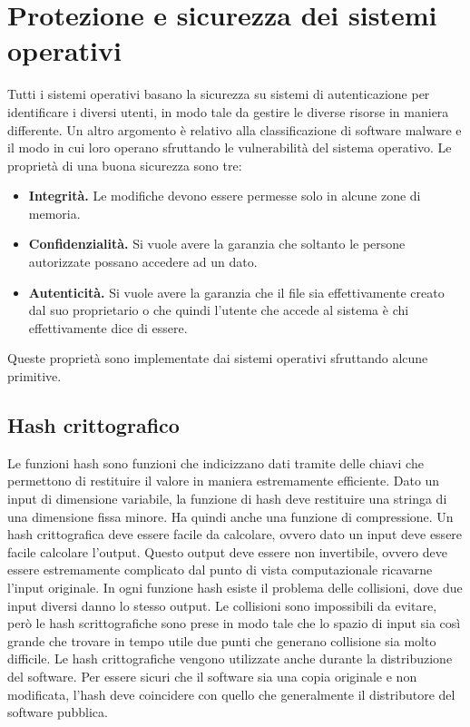 \documentclass[a4paper]{article}
\begin{document}
\newpage
\section{Protezione e sicurezza dei sistemi operativi}
Tutti i sistemi operativi basano la sicurezza su sistemi di autenticazione per identificare i diversi utenti, in modo tale da gestire le diverse risorse in maniera differente. Un altro argomento è relativo alla classificazione di software malware e il modo in cui loro operano sfruttando le vulnerabilità del sistema operativo. Le proprietà di una buona sicurezza sono tre:
\begin{itemize}
   \item \textbf{Integrità.} Le modifiche devono essere permesse solo in alcune zone di memoria.
   \item \textbf{Confidenzialità.} Si vuole avere la garanzia che soltanto le persone autorizzate possano accedere ad un dato.
   \item \textbf{Autenticità.} Si vuole avere la garanzia che il file sia effettivamente creato dal suo proprietario o che quindi l'utente che accede al sistema è chi effettivamente dice di essere.
\end{itemize}

Queste proprietà sono implementate dai sistemi operativi sfruttando alcune primitive.

\subsection{Hash crittografico}
Le funzioni hash sono funzioni che indicizzano dati tramite delle chiavi che permettono di restituire il valore in maniera estremamente efficiente. Dato un input di dimensione variabile, la funzione di hash deve restituire una stringa di una dimensione fissa minore. Ha quindi anche una funzione di compressione. Un hash crittografica deve essere facile da calcolare, ovvero dato un input deve essere facile calcolare l'output. Questo output deve essere non invertibile, ovvero deve essere estremamente complicato dal punto di vista computazionale ricavarne l'input originale. In ogni funzione hash esiste il problema delle collisioni, dove due input diversi danno lo stesso output. Le collisioni sono impossibili da evitare, però le hash scrittografiche sono prese in modo tale che lo spazio di input sia così grande che trovare in tempo utile due punti che generano collisione sia molto difficile. Le hash crittografiche vengono utilizzate anche durante la distribuzione del software. Per essere sicuri che il software sia una copia originale e non modificata, l'hash deve coincidere con quello che generalmente il distributore del software pubblica.
\end{document}
